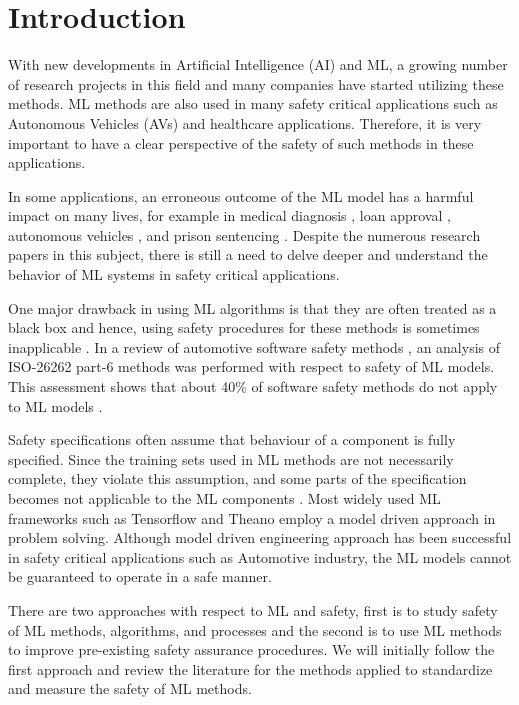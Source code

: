 \chapter{Introduction}

With new developments in Artificial Intelligence (AI) and ML, a growing number of research projects in this field and many companies have started utilizing these methods.
ML methods are also used in many safety critical applications such as Autonomous Vehicles (AVs) and healthcare applications. Therefore, it is very important to have a clear perspective of the safety of such methods in these applications.

In some applications, an erroneous outcome of the ML model has a harmful impact on many lives, for example in medical diagnosis \cite{Foster2014}, loan approval \cite{Lessmann2015}, autonomous vehicles \cite{koopman2016challenges}, and prison sentencing \cite{Berk2015}.
Despite the numerous research papers in this subject, there is still a need to delve deeper and understand the behavior of ML systems in safety critical applications.

One major drawback in using ML algorithms is that they are often treated as a black box and hence, using safety procedures for these methods is sometimes inapplicable \cite{Schwalbe2020}. In a review of automotive software safety methods \cite{Salay2017}, an analysis of ISO-26262 part-6 methods was performed with respect to safety of ML models. This assessment shows that about 40\% of software safety methods do not apply to ML models \cite{Salay2017}.


Safety specifications often assume that behaviour of a component is fully specified. Since the training sets used in ML methods are not necessarily complete, they violate this assumption, and some parts of the specification becomes not applicable to the ML components \cite{Salay2017}. 
Most widely used ML frameworks such as Tensorflow \cite{Abadi} and Theano \cite{Al-Rfou} employ a model driven approach in problem solving. Although model driven engineering approach has been successful in safety critical applications such as Automotive industry, the ML models cannot be guaranteed to operate in a safe manner. 

There are two approaches with respect to ML and safety, first is to study safety of ML methods, algorithms, and processes and the second is to use ML methods to improve pre-existing safety assurance procedures.
We will initially follow the first approach and review the literature for the methods applied to standardize and measure the safety of ML methods.

